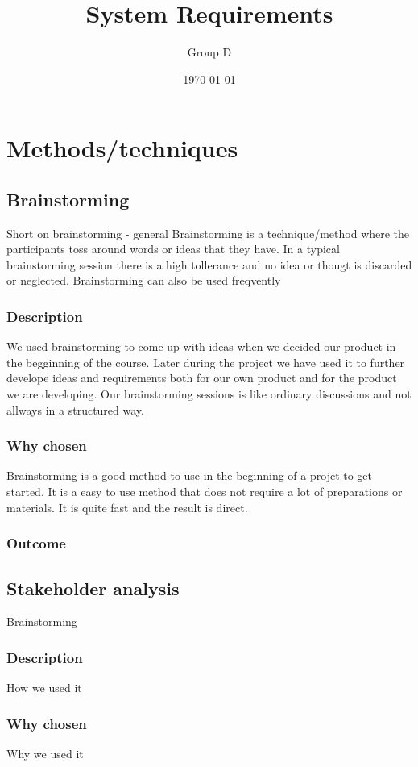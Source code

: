 \documentclass[a4paper]{article}
\title{System Requirements}
\author{Group D}
\date{\today}
\begin{document}
  \tableofcontents

  \section{Methods/techniques}
  \subsection{Brainstorming}
  Short on brainstorming - general
  Brainstorming is a technique/method where the participants toss around words or ideas that they have. In a typical brainstorming session there is a high tollerance and no idea or thougt is discarded or neglected. Brainstorming can also be used freqvently 
    \subsubsection{Description}
    We used brainstorming to come up with ideas when we decided our product in the begginning of the course. Later during the project we have used it to further develope ideas and requirements both for our own product and for the product we are developing. Our brainstorming sessions is like ordinary discussions and not allways in a structured way.
    \subsubsection{Why chosen}

    Brainstorming is a good method to use in the beginning of a projct to get started. It is a easy to use method that does not require a lot of preparations or materials. It is quite fast and the result is direct. 

    \subsubsection{Outcome}
    
    \subsection{Stakeholder analysis}
    Brainstorming
    \subsubsection{Description}
    How we used it
    \subsubsection{Why chosen}
    Why we used it
\end{document}
